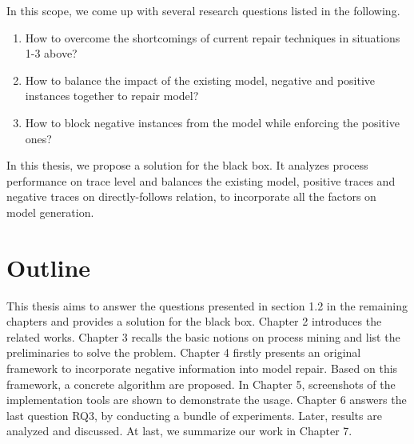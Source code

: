 In this scope, we come up with several research questions listed in the following.
\begin{enumerate}[start=1,label={\bfseries{ RQ\arabic*:}}]
	\item How to overcome the shortcomings of current repair techniques in situations 1-3 above?
	\item How to balance the impact of the existing model, negative and positive instances together to repair model? 
	\item How to block negative instances from the model while enforcing the positive ones?
\end{enumerate}
  
In this thesis, we propose a solution for the black box. It analyzes process performance on trace level and balances the existing model, positive traces and negative traces on directly-follows relation, to incorporate all the factors on model generation. 

\section{Outline}
This thesis aims to answer the questions presented in section 1.2 in the remaining chapters and provides a solution for the black box. 
Chapter 2 introduces the related works. Chapter 3 recalls the basic notions on process mining and list the preliminaries to solve the problem. 
Chapter 4 firstly presents an original framework to incorporate negative information into model repair. Based on this framework, a concrete algorithm are proposed. 
In Chapter 5, screenshots of the implementation tools are shown to demonstrate the usage.  Chapter 6 answers the last question RQ3, by conducting a bundle of experiments. Later, results are analyzed and discussed. 
At last, we summarize our work in Chapter 7. 



%